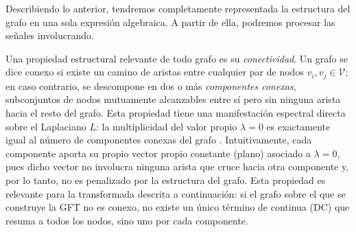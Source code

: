 
    Describiendo lo anterior, tendremos completamente representada la estructura del grafo en una sola expresión algebraica. A partir de ella, podremos procesar las señales involucrando. %

Una propiedad estructural relevante de todo grafo es su \textit{conectividad}. Un grafo se dice
conexo si existe un camino de aristas entre cualquier par de nodos $v_i, v_j \in \mathcal{V}$; en
caso contrario, se descompone en dos o más \textit{componentes conexas}, subconjuntos de nodos
mutuamente alcanzables entre sí pero sin ninguna arista hacia el resto del grafo. Esta propiedad
tiene una manifestación espectral directa sobre el Laplaciano $L$: la multiplicidad del valor
propio $\lambda = 0$ es exactamente igual al número de componentes conexas del grafo
\cite{ortega2022gsp}. Intuitivamente, cada componente aporta su propio vector propio constante
(plano) asociado a $\lambda = 0$, pues dicho vector no involucra ninguna arista que cruce hacia
otra componente y, por lo tanto, no es penalizado por la estructura del grafo. Esta propiedad es
relevante para la transformada descrita a continuación: si el grafo sobre el que se construye la
GFT no es conexo, no existe un único término de continua (DC) que resuma a todos los nodos, sino
uno por cada componente.


